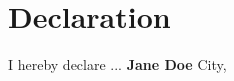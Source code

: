 \chapter*{Declaration}

\vspace{1cm} \par
{
I hereby declare ...
}
\vfill
\vspace{2.5cm} 
\normalsize
\textbf{Jane Doe} \hspace{6cm} City, \hrulefill \par
\vspace{0.25cm}
